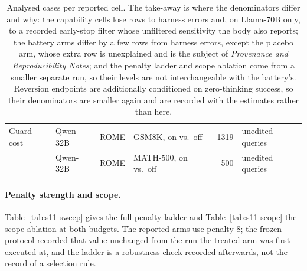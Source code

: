 \documentclass[letterpaper]{article}
\begin{document}
\begin{table}[t]
\begin{tabular}{@{}llllrl@{}}
\addlinespace
Guard cost            & Qwen-32B   & ROME  & GSM8K, on vs.\ off & 1319 & unedited queries \\
                      & Qwen-32B   & ROME  & MATH-500, on vs.\ off & 500 & unedited queries \\
\bottomrule
\end{tabular}
\caption{Analysed cases per reported cell.  The take-away is where the
denominators differ and why: the capability cells lose rows to harness errors
and, on Llama-70B only, to a recorded early-stop filter whose unfiltered
sensitivity the body also reports; the battery arms differ by a few rows from
harness errors, except the placebo arm, whose extra row is unexplained and is
the subject of \emph{Provenance and Reproducibility Notes}; and the penalty
ladder and scope
ablation come from a smaller separate run, so their levels are not
interchangeable with the battery's.  Reversion endpoints are additionally
conditioned on zero-thinking success, so their denominators are smaller again
and are recorded with the estimates rather than here.}
\label{tab:s11-counts}
\end{table}

\paragraph{Penalty strength and scope.}
Table~\ref{tab:s11-sweep} gives the full penalty ladder and
Table~\ref{tab:s11-scope} the scope ablation at both budgets.  The reported arms
use penalty \(8\); the frozen protocol recorded that value unchanged from the
run the treated arm was first executed at, and the ladder is a robustness check
recorded afterwards, not the record of a selection rule.
\end{document}
